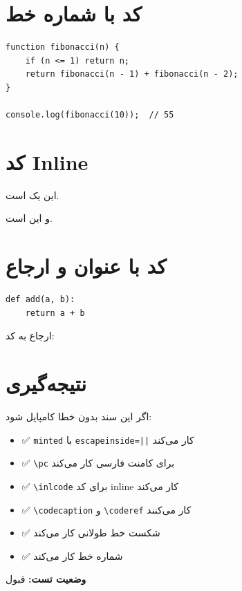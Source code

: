 \documentclass{matinbook}
\begin{document}
\section{کد با شماره خط}
\label{sec:line-numbers}

\begin{latin}
\begin{verbatim}
function fibonacci(n) {
    if (n <= 1) return n;
    return fibonacci(n - 1) + fibonacci(n - 2);
}

console.log(fibonacci(10));  // 55
\end{verbatim}
\end{latin}

\section{کد Inline}
\label{sec:inline-code}

این یک  است.

و این  است.

\section{کد با عنوان و ارجاع}
\label{sec:code-caption}

\begin{latin}
\begin{verbatim}
def add(a, b):
    return a + b
\end{verbatim}
\end{latin}

\label{code:add-function}

ارجاع به کد: 

\section{نتیجه‌گیری}
\label{sec:conclusion}

اگر این سند بدون خطا کامپایل شود:

\begin{itemize}
    \item ✅ \texttt{minted} با \texttt{escapeinside=||} کار می‌کند
    \item ✅ \texttt{\textbackslash pc} برای کامنت فارسی کار می‌کند
    \item ✅ \texttt{\textbackslash inlcode} برای کد inline کار می‌کند
    \item ✅ \texttt{\textbackslash codecaption} و \texttt{\textbackslash coderef} کار می‌کنند
    \item ✅ شکست خط طولانی کار می‌کند
    \item ✅ شماره خط کار می‌کند
\end{itemize}

\textbf{وضعیت تست:} قبول
\end{document}
